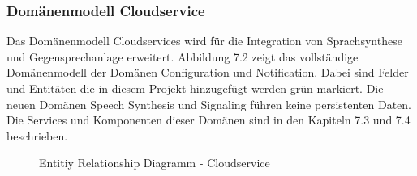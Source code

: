 \clearpage

\subsubsection{Domänenmodell Cloudservice}

Das Domänenmodell Cloudservices wird für die Integration von Sprachsynthese und Gegensprechanlage erweitert.
Abbildung 7.2 zeigt das vollständige Domänenmodell der Domänen Configuration und Notification.
Dabei sind Felder und Entitäten die in diesem Projekt hinzugefügt werden grün markiert.
Die neuen Domänen Speech Synthesis und Signaling führen keine persistenten Daten.
Die Services und Komponenten dieser Domänen sind in den Kapiteln 7.3 und 7.4 beschrieben.

\begin{figure}[h]
    \centering
    \begin{minipage}[b]{0.9\textwidth}
        \caption{Entitiy Relationship Diagramm - Cloudservice}
    \end{minipage}
\end{figure}

\clearpage

